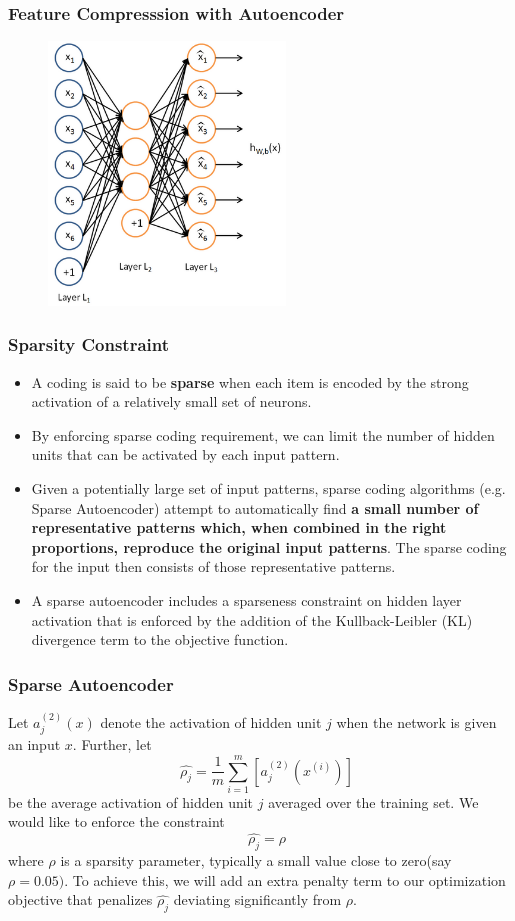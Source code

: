\documentclass{beamer}
\begin{document}
\begin{frame}
\frametitle{Feature Compresssion with Autoencoder}
\begin{figure}
\includegraphics[width=0.7\linewidth, height=7cm]{figures/autoencoder}
\end{figure}
\end{frame}

\begin{frame}
\frametitle{Sparsity Constraint}
\begin{itemize}
\item A coding is said to be \textbf{sparse} when each item is encoded by the strong activation of a relatively small set of neurons.
\item By enforcing sparse coding requirement, we can limit the number of hidden units that can be activated by each input pattern.
\item Given a potentially large set of input patterns, sparse coding algorithms (e.g. Sparse Autoencoder) attempt to automatically find \textbf{a small number of representative patterns which, when combined in the right proportions, reproduce the original input patterns}. The sparse coding for the input then consists of those representative patterns.
\item A sparse autoencoder includes a sparseness constraint on hidden layer activation that is enforced by the addition of the Kullback-Leibler (KL) divergence term to the objective function.
\end{itemize}
\end{frame}

\begin{frame}
\frametitle{Sparse Autoencoder}
Let $\textstyle{a^{(2)}_j(x)}$ denote the activation of  hidden unit $\textstyle{j}$ when the network is given an input $\textstyle{x}$. Further, let 
\[\quad \hat{ \rho_j }= \frac{1}{m} \sum_{i=1}^m \left[ a^{(2)}_j(x^{(i)}) \right] \]
be the average activation of hidden unit $\textstyle{j}$ averaged over the training set. We would like to enforce the constraint
\[ \quad \hat{\rho_j}= \rho \]
where $\textstyle{\rho}$ is a sparsity parameter, typically a small value close to zero(say $\textstyle{\rho = 0.05)}$. To achieve this, we will add an extra penalty term to our optimization objective that penalizes $\textstyle{\hat{\rho_j}}$ deviating significantly from $\textstyle{\rho}$. 
\end{frame}
\end{document}
